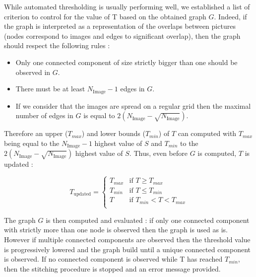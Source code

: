 \documentclass[12pt]{article}
\begin{document}
 While automated thresholding is usually performing well, we established a list of criterion to control for the value of T based on the obtained graph $G$. Indeed, if the graph is interpreted as a representation of the overlaps between pictures (nodes correspond to images and edges to significant overlap), then the graph should respect the following rules :

\begin{itemize}
\item Only one connected component of size strictly bigger than one should be observed in $G$.
\item There must be at least  $N_{\text{Image}} - 1$ edges in $G$.
\item If we consider that the images are spread on a regular grid then the maximal number of edges in $G$ is equal to $2(N_{\text{Image}}-\sqrt{N_{\text{Image}}})$.  
\end{itemize}

Therefore an upper ($T_{max}$) and lower bounds ($T_{min}$) of $T$ can computed with $T_{max}$ being equal to the $N_{\text{Image}} - 1$ highest value of $S$ and $T_{min}$ to the $2(N_{\text{Image}}-\sqrt{N_{\text{Image}}})$ highest value of $S$. Thus, even before $G$ is computed, $T$ is updated :

\begin{equation}
		T_{\text{updated}} = 
		\begin{cases}
		T_{max} & \text{if $T \geq T_{max} $}\\
		T_{min} & \text{if $T \leq T_{min}$}\\		
		T & \text{if $T_{min} < T < T_{max}  $} \\
		\end{cases}
\end{equation}

The graph $G$ is then computed and evaluated : if only one connected component with strictly more than one node  is observed then the graph is used as is. However if multiple connected components are observed then the threshold value is progressively lowered and the graph build until a unique connected component is observed. If no connected component is observed while T has reached $T_{min}$, then the stitching procedure is stopped and an error message provided.
\end{document}
